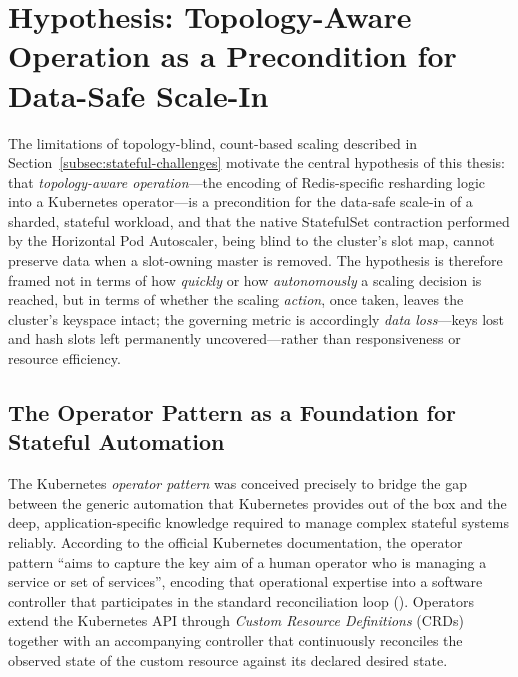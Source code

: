 \newpage
\section{Hypothesis: Topology-Aware Operation as a Precondition for Data-Safe Scale-In}
\label{sec:hypothesis}

The limitations of topology-blind, count-based scaling described in
Section~\ref{subsec:stateful-challenges} motivate the central hypothesis of this thesis:
that \textit{topology-aware operation}---the encoding of Redis-specific resharding logic
into a Kubernetes operator---is a precondition for the data-safe scale-in of a sharded,
stateful workload, and that the native StatefulSet contraction performed by the Horizontal
Pod Autoscaler, being blind to the cluster's slot map, cannot preserve data when a
slot-owning master is removed. The hypothesis is therefore framed not in terms of how
\textit{quickly} or how \textit{autonomously} a scaling decision is reached, but in terms of
whether the scaling \textit{action}, once taken, leaves the cluster's keyspace intact; the
governing metric is accordingly \textit{data loss}---keys lost and hash slots left
permanently uncovered---rather than responsiveness or resource efficiency.

\subsection{The Operator Pattern as a Foundation for Stateful Automation}

The Kubernetes \textit{operator pattern} was conceived precisely to bridge the gap between
the generic automation that Kubernetes provides out of the box and the deep,
application-specific knowledge required to manage complex stateful systems reliably.
According to the official Kubernetes documentation, the operator pattern \enquote{aims to
capture the key aim of a human operator who is managing a service or set of services},
encoding that operational expertise into a software controller that participates in the
standard reconciliation loop (\cite{kubernetes:operatorpattern}). Operators extend the
Kubernetes API through \textit{Custom Resource Definitions} (\ac{CRD}s) together with an
accompanying controller that continuously reconciles the observed state of the custom
resource against its declared desired state.

